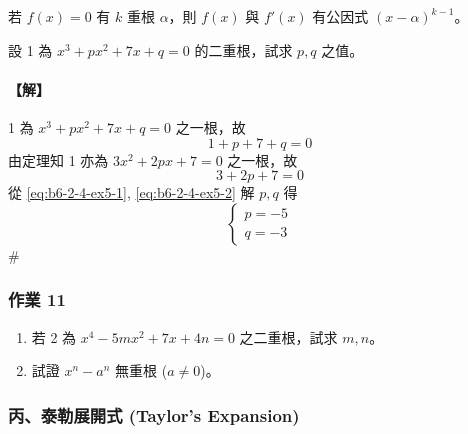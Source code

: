 \begin{corollary}\label{cor:b6-2-gcd-root}
若 $f(x)=0$ 有 $k$ 重根 $\alpha$，則 $f(x)$ 與 $f'(x)$ 有公因式 $(x-\alpha)^{k-1}$。
\end{corollary}

\begin{example}\label{ex:b6-2-18}
設 1 為 $x^3+px^2+7x+q=0$ 的二重根，試求 $p, q$ 之值。
\end{example}

\paragraph{【解】}
1 為 $x^3+px^2+7x+q=0$ 之一根，故
\begin{equation}
1 + p + 7 + q = 0 \label{eq:b6-2-4-ex5-1}
\end{equation}
由定理知 1 亦為 $3x^2+2px+7=0$ 之一根，故
\begin{equation}
3 + 2p + 7 = 0 \label{eq:b6-2-4-ex5-2}
\end{equation}
從 \eqref{eq:b6-2-4-ex5-1}, \eqref{eq:b6-2-4-ex5-2} 解 $p, q$ 得
\[ \begin{cases} p = -5 \\ q = -3 \end{cases} \]\hfill$\#$

\subsubsection*{作業 11}\label{hw:b6-2-11}
\begin{enumerate}[label=(\roman*), leftmargin=2em]
  \item 若 2 為 $x^4-5mx^2+7x+4n=0$ 之二重根，試求 $m, n$。
  \item 試證 $x^n-a^n$ 無重根 ($a \ne 0$)。
\end{enumerate}

\subsubsection*{丙、泰勒展開式 (Taylor's Expansion)}\label{subsec:b6-2-4-c}

